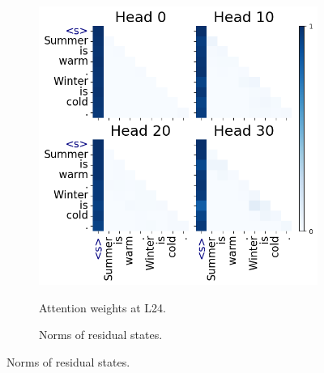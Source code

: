 \begin{figure}[t]
  \centering
  \begin{subfigure}[t]{0.32\textwidth}
      \centering 
      \caption{\small Attention weights at L24.}
      \includegraphics[width=\textwidth]{Figures/demo_attn_sink.png}
      \label{fig:attention_sinks_wide_random}
  \end{subfigure}
  \hfill
  \begin{subfigure}[t]{0.3\textwidth}
      \centering 
      \caption{\small Norms of residual states.}

\end{subfigure}
\end{figure}
